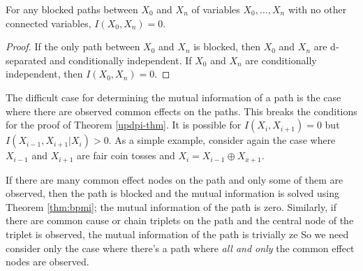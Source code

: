 \documentclass[../thesis.tex]{subfiles}
\begin{document}
\begin{thm}
  \label{thm:bpmi}
  For any blocked paths between $X_0$ and $X_n$
  of variables $X_0, ..., X_n$ with no other connected
  variables, $I(X_0,X_n) = 0$.
\end{thm}
\begin{proof}
  If the only path between $X_0$ and $X_n$ is blocked,
  then $X_0$ and $X_n$ are d-separated and 
  conditionally independent. If $X_0$ and $X_n$ are
  conditionally independent,
  then $I(X_0, X_n) = 0$.
\end{proof}

The difficult case for determining the mutual information
of a path is the case where there are observed common
effects on the paths.
This breaks the conditions for the proof of Theorem \ref{updpi-thm}.
It is possible for $I(X_i,X_{i+1}) = 0$ but
$I(X_{i-1},X_{i+1} \vert X_i) > 0$.
As a simple example, consider again the case where
$X_{i-1}$ and $X_{i+1}$ are fair coin tosses and
$X_i = X_{i-1} \oplus X_{x+1}$.

If there are many common effect nodes on the path and
only some of them are observed, then the path is
blocked and the mutual information is solved using
Theorem \ref{thm:bpmi}; the mutual information of the
path is zero.
Similarly, if there are common cause or chain triplets
on the path and the central node of the triplet is observed,
the mutual information of the path is trivially ze
So we need consider only the case where there's
a path where \emph{all and only} the common effect
nodes are observed.
\end{document}
